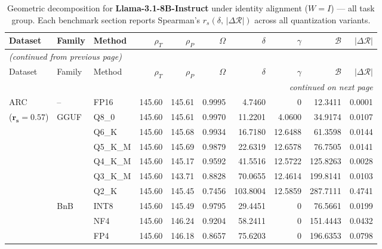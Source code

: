 \begingroup
\small
\setlength{\tabcolsep}{4pt}
\renewcommand{\arraystretch}{1.05}
\setlength{\LTcapwidth}{\textwidth}
\begin{longtable}{ll l rrrrrrr}
\caption{Geometric decomposition for \textbf{Llama-3.1-8B-Instruct} under identity alignment ($W{=}I$) --- all task group. Each benchmark section reports Spearman's $r_s(\delta,\,|\Delta\mathcal{R}|)$ across all quantization variants.}\label{tab:llama_instruct_decomposition_all}\\
\toprule
Dataset & Family & Method & $\rho_T$ & $\rho_P$ & $\Omega$ & $\delta$ & $\gamma$ & $\mathcal{B}$ & $|\Delta\mathcal{R}|$ \\
\midrule
\endfirsthead
\multicolumn{10}{l}{\small\itshape (continued from previous page)}\\
\toprule
Dataset & Family & Method & $\rho_T$ & $\rho_P$ & $\Omega$ & $\delta$ & $\gamma$ & $\mathcal{B}$ & $|\Delta\mathcal{R}|$ \\
\midrule
\endhead
\midrule
\multicolumn{10}{r}{\small\itshape continued on next page}\\
\endfoot
\bottomrule
\endlastfoot
ARC & -- & FP16 & 145.60 & 145.61 & 0.9995 & 4.7460 & \cellcolor{cyan!12} $0$ & 12.3411 & 0.0001 \\
{\small ($\mathbf{r_s{=}0.57}$)} & GGUF & Q8\_0 & 145.60 & 145.61 & 0.9970 & 11.2201 & 4.0600 & 34.9174 & 0.0107 \\
 &  & Q6\_K & 145.60 & 145.68 & 0.9934 & 16.7180 & 12.6488 & 61.3598 & 0.0144 \\
 &  & Q5\_K\_M & 145.60 & 145.69 & 0.9879 & 22.6319 & 12.6578 & 76.7505 & 0.0141 \\
 &  & Q4\_K\_M & 145.60 & 145.17 & 0.9592 & 41.5516 & 12.5722 & 125.8263 & 0.0028 \\
 &  & Q3\_K\_M & 145.60 & 143.71 & \cellcolor{red!18} 0.8828 & \cellcolor{red!18} 70.0655 & 12.4614 & \cellcolor{red!18} 199.8141 & \cellcolor{red!18} 0.0103 \\
 &  & Q2\_K & 145.60 & 145.45 & \cellcolor{red!35} 0.7456 & \cellcolor{red!35} 103.8004 & 12.5859 & \cellcolor{red!35} 287.7111 & \cellcolor{red!35} 0.4741 \\
 & BnB & INT8 & 145.60 & 145.49 & 0.9795 & 29.4451 & \cellcolor{cyan!12} $0$ & 76.5661 & 0.0199 \\
 &  & NF4 & 145.60 & 146.24 & \cellcolor{red!18} 0.9204 & \cellcolor{red!18} 58.2411 & \cellcolor{cyan!12} $0$ & \cellcolor{red!18} 151.4443 & \cellcolor{red!18} 0.0432 \\
 &  & FP4 & 145.60 & 146.18 & \cellcolor{red!18} 0.8657 & \cellcolor{red!18} 75.6203 & \cellcolor{cyan!12} $0$ & \cellcolor{red!18} 196.6353 & \cellcolor{red!18} 0.0798 \\

\end{longtable}
